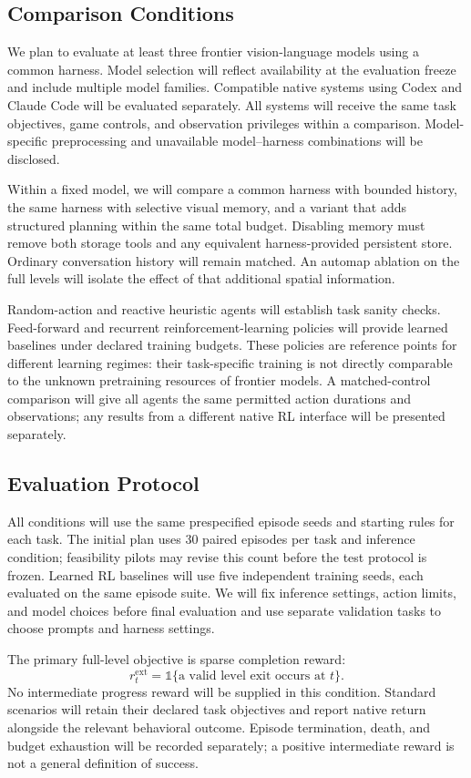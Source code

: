 \subsection{Comparison Conditions}
We plan to evaluate at least three frontier vision-language models using a common harness. Model selection will reflect availability at the evaluation freeze and include multiple model families. Compatible native systems using Codex and Claude Code will be evaluated separately. All systems will receive the same task objectives, game controls, and observation privileges within a comparison. Model-specific preprocessing and unavailable model--harness combinations will be disclosed.

Within a fixed model, we will compare a common harness with bounded history, the same harness with selective visual memory, and a variant that adds structured planning within the same total budget. Disabling memory must remove both storage tools and any equivalent harness-provided persistent store. Ordinary conversation history will remain matched. An automap ablation on the full levels will isolate the effect of that additional spatial information.

Random-action and reactive heuristic agents will establish task sanity checks. Feed-forward and recurrent reinforcement-learning policies will provide learned baselines under declared training budgets. These policies are reference points for different learning regimes: their task-specific training is not directly comparable to the unknown pretraining resources of frontier models. A matched-control comparison will give all agents the same permitted action durations and observations; any results from a different native RL interface will be presented separately.

\subsection{Evaluation Protocol}
All conditions will use the same prespecified episode seeds and starting rules for each task. The initial plan uses 30 paired episodes per task and inference condition; feasibility pilots may revise this count before the test protocol is frozen. Learned RL baselines will use five independent training seeds, each evaluated on the same episode suite. We will fix inference settings, action limits, and model choices before final evaluation and use separate validation tasks to choose prompts and harness settings.

The primary full-level objective is sparse completion reward:
\begin{equation}
 r_t^{\mathrm{ext}}=\mathbb{1}\{\text{a valid level exit occurs at }t\}.
\end{equation}
No intermediate progress reward will be supplied in this condition. Standard scenarios will retain their declared task objectives and report native return alongside the relevant behavioral outcome. Episode termination, death, and budget exhaustion will be recorded separately; a positive intermediate reward is not a general definition of success.

